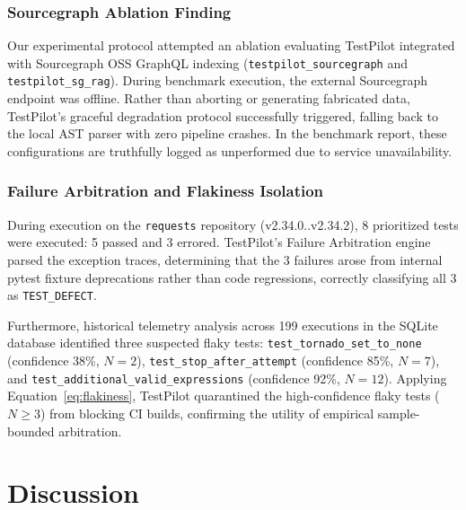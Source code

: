 \documentclass[12pt,onecolumn,draftclsnofoot]{IEEEtran}
\begin{document}
\subsubsection{Sourcegraph Ablation Finding}
Our experimental protocol attempted an ablation evaluating TestPilot integrated with Sourcegraph OSS GraphQL indexing (\texttt{testpilot\_sourcegraph} and \texttt{testpilot\_sg\_rag}). During benchmark execution, the external Sourcegraph endpoint was offline. Rather than aborting or generating fabricated data, TestPilot's graceful degradation protocol successfully triggered, falling back to the local AST parser with zero pipeline crashes. In the benchmark report, these configurations are truthfully logged as unperformed due to service unavailability.

\subsubsection{Failure Arbitration and Flakiness Isolation}
During execution on the \texttt{requests} repository (v2.34.0..v2.34.2), 8 prioritized tests were executed: 5 passed and 3 errored. TestPilot's Failure Arbitration engine parsed the exception traces, determining that the 3 failures arose from internal pytest fixture deprecations rather than code regressions, correctly classifying all 3 as \texttt{TEST\_DEFECT}. 

Furthermore, historical telemetry analysis across 199 executions in the SQLite database identified three suspected flaky tests: \texttt{test\_tornado\_set\_to\_none} (confidence 38\%, $N=2$), \texttt{test\_stop\_after\_attempt} (confidence 85\%, $N=7$), and \texttt{test\_additional\_valid\_expressions} (confidence 92\%, $N=12$). Applying Equation~\eqref{eq:flakiness}, TestPilot quarantined the high-confidence flaky tests ($N \ge 3$) from blocking CI builds, confirming the utility of empirical sample-bounded arbitration.

\section{Discussion}
\label{sec:discussion}
\end{document}

